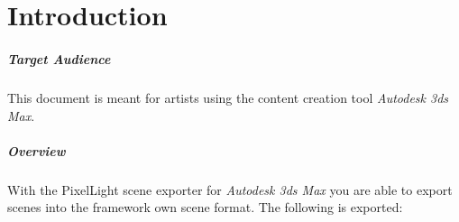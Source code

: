 \chapter{Introduction}


\paragraph{Target Audience}
This document is meant for artists using the content creation tool \emph{Autodesk 3ds Max}.


\paragraph{Overview}
With the PixelLight scene exporter for \emph{Autodesk 3ds Max} you are able to export scenes into the framework own scene format. The following is exported:
